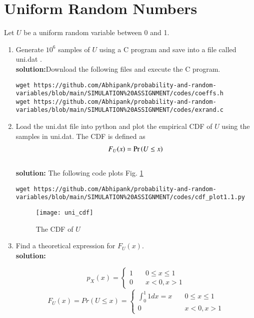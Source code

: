 \documentclass[journal,12pt,twocolumn]{IEEEtran}
\renewcommand\thesection{\arabic{section}}
\begin{document}
\section{Uniform Random Numbers}
Let $U$ be a uniform random variable between 0 and 1.
\begin{enumerate}[label=\thesection.\arabic*
,ref=\thesection.\theenumi]
\item Generate $10^6$ samples of $U$ using a C program and save into a file called uni.dat .
\\
\textbf{solution:}Download the following files and execute the  C program.
\begin{lstlisting}
wget https://github.com/Abhipank/probability-and-random-variables/blob/main/SIMULATION%20ASSIGNMENT/codes/coeffs.h
wget https://github.com/Abhipank/probability-and-random-variables/blob/main/SIMULATION%20ASSIGNMENT/codes/exrand.c
\end{lstlisting}
%
\item
Load the uni.dat file into python and plot the empirical CDF of $U$ using the samples in uni.dat. The CDF is defined as
\begin{align}
F_{U}(x) = \Pr\left(U \le x\right)
\end{align}
\\
\textbf{solution:}  The following code plots Fig. \ref{fig:uni_cdf}
\begin{lstlisting}
wget https://github.com/Abhipank/probability-and-random-variables/blob/main/SIMULATION%20ASSIGNMENT/codes/cdf_plot1.1.py
\end{lstlisting}
\begin{figure}
\centering
\texttt{[image: uni\_cdf]}
\caption{The CDF of $U$}
\label{fig:uni_cdf}
\end{figure}
%
\item
Find a  theoretical expression for $F_{U}(x)$.\\
\textbf{solution:}

\begin{equation}
p_X(x) = \left\{
        \begin{array}{ll}
            1 & \quad 0 \leq  x \leq 1\\
            0 & \quad x < 0,x > 1
        \end{array}
    \right.
\end{equation}
\begin{equation}
F_U(x) =Pr(U \leq x)= \left\{
        \begin{array}{ll}
            \int_{0}^1 1dx=x & \quad 0 \leq  x \leq 1\\
            0 & \quad x < 0,x > 1
        \end{array}
    \right.  
\end{equation}



\end{enumerate}
\end{document}
